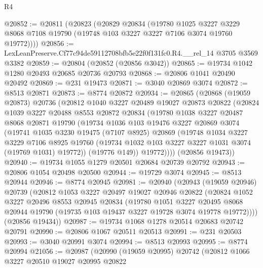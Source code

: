 \begin{lexlean}{R4}
\begin{coremodule}
@20852 := @20811
    (@20823
      (@20829
        @20834
        (@19780
          @1025
          @3227
          @3229
          @8068
          @7108
          @19790
          (@19748 @103 @3227 @3227 @7106 @3074 @19760 @19772))))
@20856 := LexLeanPreserve.Cf77c94de59112708bfb5e22f0f131fc0.R4.__rel_14 @3705 @3569 @3382
@20859 := @20804 (@20852 (@20856 @3042))
@20865 := @19734 @1042 @1280 @20493 @20685 @20736 @20793
@20868 := @20806 @1041 @20490 @20492
@20869 := @231 @19473
@20871 := @3040 @20869 @3074
@20872 := @8513 @20871
@20873 := @8774 @20872
@20934 := @20865
    (@20868
      (@19059 @20873)
      @20736
      (@20812
        @1040
        @3227
        @20489
        @19027
        @20873
        @20822
        (@20824
          @1039
          @3227
          @20488
          @8553
          @20872
          @20834
          (@19780
            @1038
            @3227
            @20487
            @8068
            @20871
            @19790
            (@19734
              @1036
              @103
              @19476
              @3227
              @20869
              @3074
              (@19741
                @1035
                @3230
                @19475
                (@7107 @8925)
                @20869
                (@19748
                  @1034
                  @3227
                  @3229
                  @7106
                  @8925
                  @19760
                  (@19734 @1032 @103 @3227 @3227 @1031 @3074 (@19769 @1031) @19772))
                (@19776 @149))
              @19772))))
      (@20856 @19473))
@20940 := @19734 @1055 @1279 @20501 @20684 @20739 @20792
@20943 := @20806 @1054 @20498 @20500
@20944 := @19729 @3074
@20945 := @8513 @20944
@20946 := @8774 @20945
@20981 := @20940
    (@20943
      (@19059 @20946)
      @20739
      (@20812
        @1053
        @3227
        @20497
        @19027
        @20946
        @20822
        (@20824
          @1052
          @3227
          @20496
          @8553
          @20945
          @20834
          (@19780
            @1051
            @3227
            @20495
            @8068
            @20944
            @19790
            (@19735 @103 @19437 @3227 @19728 @3074 @19778 @19772))))
      (@20856 @19434))
@20987 := @19734 @1068 @1278 @20514 @20683 @20742 @20791
@20990 := @20806 @1067 @20511 @20513
@20991 := @231 @20503
@20993 := @3040 @20991 @3074
@20994 := @8513 @20993
@20995 := @8774 @20994
@21056 := @20987
    (@20990
      (@19059 @20995)
      @20742
      (@20812
        @1066
        @3227
        @20510
        @19027
        @20995
        @20822

\end{coremodule}
\end{lexlean}
